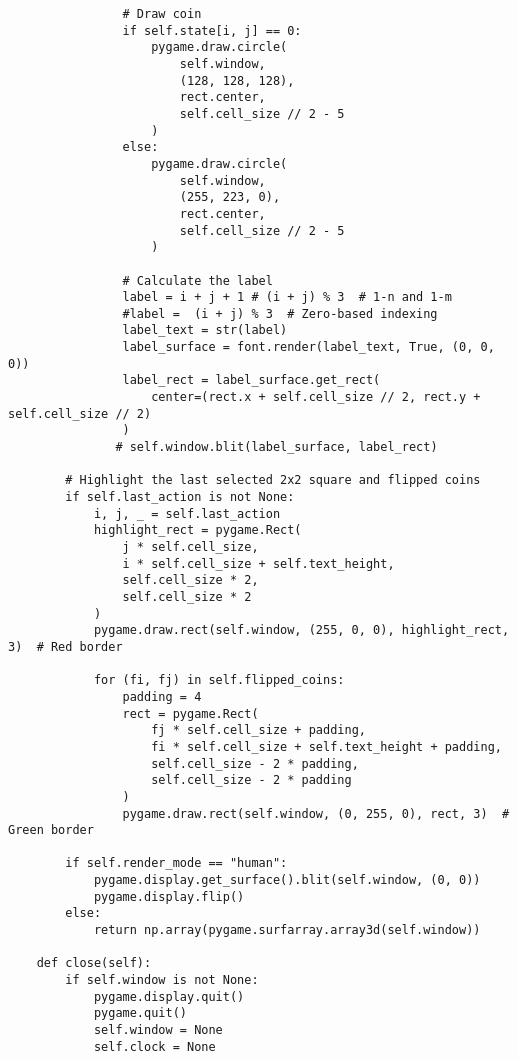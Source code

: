 \begin{lstlisting}
                # Draw coin
                if self.state[i, j] == 0:
                    pygame.draw.circle(
                        self.window,
                        (128, 128, 128),
                        rect.center,
                        self.cell_size // 2 - 5
                    )
                else:
                    pygame.draw.circle(
                        self.window,
                        (255, 223, 0),
                        rect.center,
                        self.cell_size // 2 - 5
                    )

                # Calculate the label
                label = i + j + 1 # (i + j) % 3  # 1-n and 1-m
                #label =  (i + j) % 3  # Zero-based indexing
                label_text = str(label)
                label_surface = font.render(label_text, True, (0, 0, 0))
                label_rect = label_surface.get_rect(
                    center=(rect.x + self.cell_size // 2, rect.y + self.cell_size // 2)
                )
               # self.window.blit(label_surface, label_rect)

        # Highlight the last selected 2x2 square and flipped coins
        if self.last_action is not None:
            i, j, _ = self.last_action
            highlight_rect = pygame.Rect(
                j * self.cell_size,
                i * self.cell_size + self.text_height,
                self.cell_size * 2,
                self.cell_size * 2
            )
            pygame.draw.rect(self.window, (255, 0, 0), highlight_rect, 3)  # Red border

            for (fi, fj) in self.flipped_coins:
                padding = 4
                rect = pygame.Rect(
                    fj * self.cell_size + padding,
                    fi * self.cell_size + self.text_height + padding,
                    self.cell_size - 2 * padding,
                    self.cell_size - 2 * padding
                )
                pygame.draw.rect(self.window, (0, 255, 0), rect, 3)  # Green border

        if self.render_mode == "human":
            pygame.display.get_surface().blit(self.window, (0, 0))
            pygame.display.flip()
        else:
            return np.array(pygame.surfarray.array3d(self.window))

    def close(self):
        if self.window is not None:
            pygame.display.quit()
            pygame.quit()
            self.window = None
            self.clock = None
            
\end{lstlisting}


